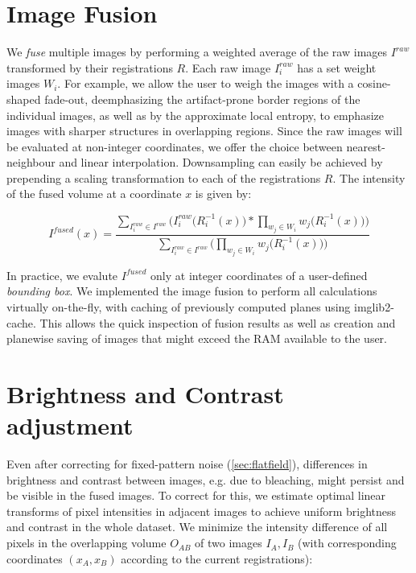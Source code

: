 \section{Image Fusion}
\label{sec:fusion}

We \emph{fuse} multiple images by performing a weighted average of the raw images $I^{raw}$ transformed by their registrations $R$. Each raw image $I^{raw}_i$ has a set weight images $W_i$. For example, we allow the user to weigh the images with a cosine-shaped fade-out, deemphasizing the artifact-prone border regions of the individual images, as well as by the approximate local entropy, to emphasize images with sharper structures in overlapping regions. Since the raw images will be evaluated at non-integer coordinates, we offer the choice between nearest-neighbour and linear interpolation. Downsampling can easily be achieved by prepending a scaling transformation to each of the registrations $R$. The intensity of the fused volume at a coordinate $x$ is given by:

\begin{equation}
\label{eq:fusion-eq1}
I^{fused}(x) ={ \frac{  \sum_{ I^{raw}_i \in I^{raw}} \Big(I^{raw}_i\big(R_i^{-1}(x)\big) * \prod_{w_j \in W_i}{w_j\big(R_i^{-1}(x)\big)\Big)}}{ \sum_{I^{raw}_i \in I^{raw}}\Big( \prod_{w_j \in W_i}{w_j\big(R_i^{-1}(x)\big)\Big)}}}
\end{equation}

In practice, we evalute $I^{fused}$ only at integer coordinates of a user-defined \emph{bounding box}. We implemented the image fusion to perform all calculations virtually on-the-fly, with caching of previously computed planes using imglib2-cache. This allows the quick inspection of fusion results as well as creation and planewise saving of images that might exceed the RAM available to the user.

\section{Brightness and Contrast adjustment}
\label{sec:brightness-adjust}

Even after correcting for fixed-pattern noise (\ref{sec:flatfield}), differences in brightness and contrast between images, e.g. due to bleaching, might persist and be visible in the fused images. To correct for this, we estimate optimal linear transforms of pixel intensities in adjacent images \cite{blasse2017premosa} to achieve uniform brightness and contrast in the whole dataset. We minimize the intensity difference of all pixels in the overlapping volume $O_{AB}$ of two images $I_A, I_B$ (with corresponding coordinates $(x_A, x_B)$ according to the current registrations): 


